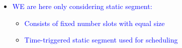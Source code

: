 \begin{frame}
\begin{itemize}
\item \tiny{\textcolor{blue}{WE are here only considering static segment:}}
      \begin{itemize}
       \item \tiny{\textcolor{blue}{Consists of fixed number slots with equal size}}
       \item \tiny{\textcolor{blue}{Time-triggered static segment used for scheduling}}
      \end{itemize}

 
       
\end{itemize}

\end{frame}